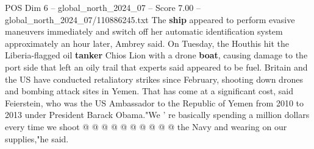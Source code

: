 \begin{textsample}{POS Dim 6 – global\_north\_2024\_07 – Score 7.00 – global\_north\_2024\_07/110886245.txt}
The \textbf{ship} appeared to perform evasive maneuvers immediately and switch off her automatic identification system approximately an hour later, Ambrey said.
On Tuesday, the Houthis hit the Liberia-flagged oil \textbf{tanker} Chios Lion with a drone \textbf{boat}, causing damage to the port side that left an oily trail that experts said appeared to be fuel.
Britain and the US have conducted retaliatory strikes since February, shooting down drones and bombing attack sites in Yemen.
That has come at a significant cost, said Feierstein, who was the US Ambassador to the Republic of Yemen from 2010 to 2013 under President Barack Obama."We ' re basically spending a million dollars every time we shoot @ @ @ @ @ @ @ @ @ @ the Navy and wearing on our supplies,"he said.

\end{textsample}
